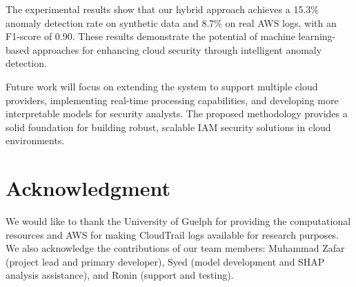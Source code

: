 \documentclass[conference]{IEEEtran}
\begin{document}
The experimental results show that our hybrid approach achieves a 15.3\% anomaly detection rate on synthetic data and 8.7\% on real AWS logs, with an F1-score of 0.90. These results demonstrate the potential of machine learning-based approaches for enhancing cloud security through intelligent anomaly detection.

Future work will focus on extending the system to support multiple cloud providers, implementing real-time processing capabilities, and developing more interpretable models for security analysts. The proposed methodology provides a solid foundation for building robust, scalable IAM security solutions in cloud environments.

\section*{Acknowledgment}
We would like to thank the University of Guelph for providing the computational resources and AWS for making CloudTrail logs available for research purposes. We also acknowledge the contributions of our team members: Muhammad Zafar (project lead and primary developer), Syed (model development and SHAP analysis assistance), and Ronin (support and testing).
\end{document}
